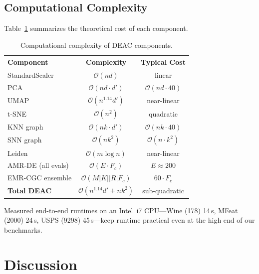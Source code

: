 \documentclass[journal]{IEEEtran}
\begin{document}
\subsection{Computational Complexity}

Table~\ref{tab:complexity} summarizes the theoretical cost of each component.

\begin{table}[htbp]
\centering
\caption{Computational complexity of DEAC components.}
\label{tab:complexity}
\footnotesize
\setlength{\tabcolsep}{3pt}
\begin{tabular}{lcc}
\toprule
Component & Complexity & Typical Cost \\
\midrule
StandardScaler        & $\mathcal{O}(nd)$                   & linear \\
PCA                   & $\mathcal{O}(nd \cdot d')$          & $\mathcal{O}(nd \cdot 40)$ \\
UMAP                  & $\mathcal{O}(n^{1.14} d')$          & near-linear \\
t-SNE                 & $\mathcal{O}(n^2)$                  & quadratic \\
KNN graph             & $\mathcal{O}(nk \cdot d')$          & $\mathcal{O}(nk \cdot 40)$ \\
SNN graph             & $\mathcal{O}(nk^2)$                 & $\mathcal{O}(n \cdot k^2)$ \\
Leiden                & $\mathcal{O}(m \log n)$             & near-linear \\
AMR-DE (all evals)    & $\mathcal{O}(E \cdot F_c)$          & $E{\approx}200$ \\
EMR-CGC ensemble      & $\mathcal{O}(M|K||R| F_c)$          & $60 \cdot F_c$ \\
\midrule
\textbf{Total DEAC}   & $\mathcal{O}(n^{1.14} d' + n k^2)$  & sub-quadratic \\
\bottomrule
\end{tabular}
\end{table}

Measured end-to-end runtimes on an Intel~i7 CPU---Wine (178) 14\,s, MFeat (2000) 24\,s, USPS (9298) 45\,s---keep runtime practical even at the high end of our benchmarks.

\section{Discussion}\label{sec:disc}
\end{document}
